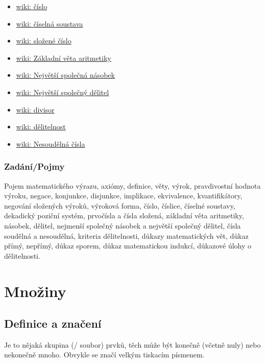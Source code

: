 \documentclass[12pt]{article}
\begin{document}
\begin{itemize}
\item \href{https://cs.wikipedia.org/wiki/\%C4\%8C\%C3\%ADslo}{wiki: číslo}
\item \href{https://cs.wikipedia.org/wiki/\%C4\%8C\%C3\%ADseln\%C3\%A1_soustava}{wiki: číselná soustava}
\item \href{https://cs.wikipedia.org/wiki/Slo\%C5\%BEen\%C3\%A9_\%C4\%8D\%C3\%ADslo}{wiki: složené číslo}
\item \href{https://cs.wikipedia.org/wiki/Z\%C3\%A1kladn\%C3\%AD_v\%C4\%9Bta_aritmetiky}{wiki: Základní věta aritmetiky}
\item \href{https://cs.wikipedia.org/wiki/Nejmen\%C5\%A1\%C3\%AD_spole\%C4\%8Dn\%C3\%BD_n\%C3\%A1sobek}{wiki: Největší společná násobek}
\item \href{https://cs.wikipedia.org/wiki/Nejv\%C4\%9Bt\%C5\%A1\%C3\%AD_spole\%C4\%8Dn\%C3\%BD_d\%C4\%9Blitel}{wiki: Největší společný dělitel}
\item \href{https://en.wikipedia.org/wiki/Divisor}{wiki: divisor}
\item \href{https://cs.wikipedia.org/wiki/D\%C4\%9Blitelnost}{wiki: dělitelnost}
\item \href{https://cs.wikipedia.org/wiki/Nesoud\%C4\%9Bln\%C3\%A1_\%C4\%8D\%C3\%ADsla}{wiki: Nesoudělná čísla}
\end{itemize}
\subsubsection{Zadání/Pojmy}
Pojem matematického výrazu, axiómy, definice, věty, výrok, pravdivostní hodnota výroku, negace, konjunkce, disjunkce, implikace, ekvivalence, kvantifikátory, negování složených výroků, výroková forma, číslo, číslice, číselné soustavy, dekadický poziční systém, prvočísla a čísla složená, základní věta aritmetiky, násobek, dělitel, nejmenší společný násobek a největší společný dělitel, čísla soudělná a nesoudělná, kriteria dělitelnosti, důkazy matematických vět, důkaz přímý, nepřímý, důkaz sporem, důkaz matematickou indukcí, důkazové úlohy o dělitelnosti.

\section{Množiny}
\subsection{Definice a značení}
Je to nějaká skupina (/ soubor) prvků, těch může být konečně (včetně  nuly) nebo nekonečně mnoho. Obvykle se značí velkým tiskacím písmenem.
\end{document}

